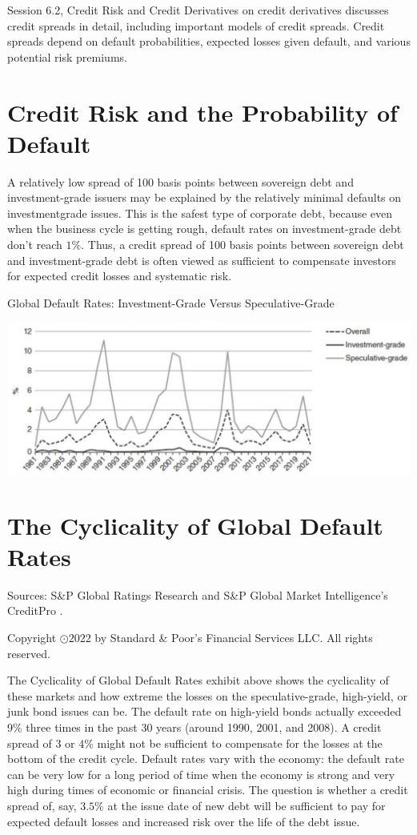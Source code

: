 \documentclass[11pt]{article}
\begin{document}
Session 6.2, Credit Risk and Credit Derivatives on credit derivatives discusses credit spreads in detail, including important models of credit spreads. Credit spreads depend on default probabilities, expected losses given default, and various potential risk premiums.

\section*{Credit Risk and the Probability of Default}
A relatively low spread of 100 basis points between sovereign debt and investment-grade issuers may be explained by the relatively minimal defaults on investmentgrade issues. This is the safest type of corporate debt, because even when the business cycle is getting rough, default rates on investment-grade debt don't reach $1 \%$. Thus, a credit spread of 100 basis points between sovereign debt and investment-grade debt is often viewed as sufficient to compensate investors for expected credit losses and systematic risk.

Global Default Rates: Investment-Grade Versus Speculative-Grade

\begin{center}
\includegraphics[max width=\textwidth]{2024_04_10_a4f1ca289b861eaba170g-3}
\end{center}

\section*{The Cyclicality of Global Default Rates}
Sources: S\&P Global Ratings Research and S\&P Global Market Intelligence's CreditPro .

Copyright $\odot 2022$ by Standard \& Poor's Financial Services LLC. All rights reserved.

The Cyclicality of Global Default Rates exhibit above shows the cyclicality of these markets and how extreme the losses on the speculative-grade, high-yield, or junk bond issues can be. The default rate on high-yield bonds actually exceeded 9\% three times in the past 30 years (around 1990, 2001, and 2008). A credit spread of 3 or $4 \%$ might not be sufficient to compensate for the losses at the bottom of the credit cycle. Default rates vary with the economy: the default rate can be very low for a long period of time when the economy is strong and very high during times of economic or financial crisis. The question is whether a credit spread of, say, $3.5 \%$ at the issue date of new debt will be sufficient to pay for expected default losses and increased risk over the life of the debt issue.
\end{document}
